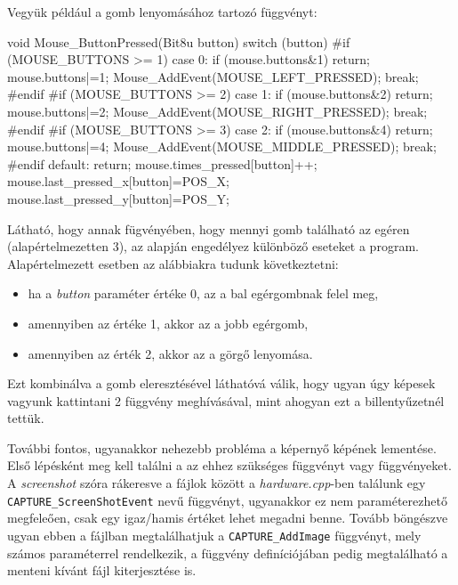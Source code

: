 Vegyük például a gomb lenyomásához tartozó függvényt:
\begin{cpp}

    void Mouse_ButtonPressed(Bit8u button) {
            switch (button) {
        #if (MOUSE_BUTTONS >= 1)
            case 0:
                if (mouse.buttons&1) return;
                mouse.buttons|=1;
                Mouse_AddEvent(MOUSE_LEFT_PRESSED);
                break;
        #endif
        #if (MOUSE_BUTTONS >= 2)
            case 1:
                if (mouse.buttons&2) return;
                mouse.buttons|=2;
                Mouse_AddEvent(MOUSE_RIGHT_PRESSED);
                break;
        #endif
        #if (MOUSE_BUTTONS >= 3)
            case 2:
                if (mouse.buttons&4) return;
                mouse.buttons|=4;
                Mouse_AddEvent(MOUSE_MIDDLE_PRESSED);
                break;
        #endif
            default:
                return;
            }
        mouse.times_pressed[button]++;
        mouse.last_pressed_x[button]=POS_X;
        mouse.last_pressed_y[button]=POS_Y;
    }

\end{cpp}

Látható, hogy annak fügvényében, hogy mennyi gomb található az egéren (alapértelmezetten 3), az alapján engedélyez különböző eseteket a program. Alapértelmezett esetben az alábbiakra tudunk következtetni:
\begin{itemize}
    \item ha a \textit{button} paraméter értéke 0, az a bal egérgombnak felel meg,
    \item amennyiben az értéke 1, akkor az a jobb egérgomb,
    \item amennyiben az érték 2, akkor az a görgő lenyomása.
\end{itemize}
Ezt kombinálva a gomb eleresztésével láthatóvá válik, hogy ugyan úgy képesek vagyunk kattintani 2 függvény meghívásával, mint ahogyan ezt a billentyűzetnél tettük.


További fontos, ugyanakkor nehezebb probléma a képernyő képének lementése. Első lépésként meg kell találni a az ehhez szükséges függvényt vagy függvényeket. 
A \textit{screenshot} szóra rákeresve a fájlok között a \textit{hardware.cpp}-ben találunk egy\\ \verb|CAPTURE_ScreenShotEvent| nevű függvényt, ugyanakkor ez nem paraméterezhető megfeleően, csak egy igaz/hamis értéket lehet megadni benne. 
Tovább böngészve ugyan ebben a fájlban megtalálhatjuk a \verb|CAPTURE_AddImage| függvényt, mely számos paraméterrel rendelkezik, a függvény definíciójában pedig megtalálható a menteni kívánt fájl kiterjesztése is.

